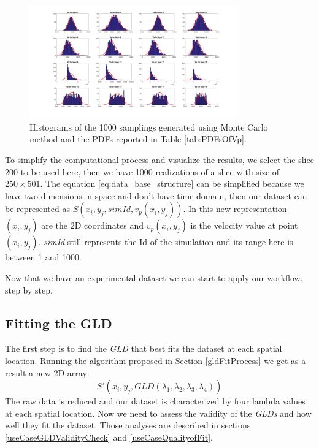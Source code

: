 \begin{figure}[ht]
    \centering
    \includegraphics[width=0.8\textwidth]{images/vp_1000_realizations.png}
    \caption{Histograms of the 1000 samplings generated using Monte Carlo method and the PDFs reported in Table \ref{tab:PDFsOfVp}.}
    \label{fig:vp_1000_realizations}
\end{figure}

To simplify the computational process and visualize the results, we select the slice 200 to be used here, then we have 1000 realizations of a slice with size of $250\times501$. The equation \ref{eq:data_base_structure} can be simplified because we have two dimensions in space and don't have time domain, then our dataset can be represented as $S(x_{i},y_{j},simId,v_{p}(x_{i},y_{j}))$. In this new representation $(x_{i},y_{j})$ are the 2D coordinates and $v_{p}(x_{i},y_{j})$ is the velocity value at point $(x_{i},y_{j})$. \textit{simId} still represents the Id of the simulation and its range here is between 1 and 1000.

Now that we have an experimental dataset we can start to apply our workflow, step by step.

\subsection{Fitting the GLD}
The first step is to find the \textit{GLD} that best fits the dataset at each spatial location. Running the algorithm proposed in Section \ref{gldFitProcess} we get as a result a new 2D array:
\begin{equation}\label{eq:gld_fit_2D}
S'(x_{i},y_{j},GLD(\lambda_{1}, \lambda_{2}, \lambda_{3}, \lambda_{4}))
\end{equation}
The raw data is reduced and our dataset is characterized by four lambda values at each spatial location. Now we need to assess the validity of the \textit{GLDs} and how well they fit the dataset. Those analyses are described in sections \ref{useCaseGLDValidityCheck} and \ref{useCaseQualityofFit}. 

